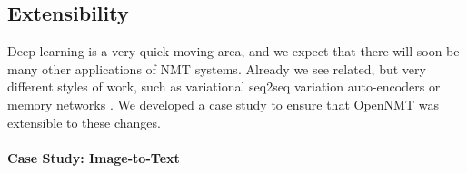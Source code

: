 \documentclass[11pt]{article}
\begin{document}



\subsection{Extensibility}

Deep learning is a very quick moving area, and we expect that there
will soon be many other applications of NMT systems.  Already we see
related, but very different styles of work, such as variational
seq2seq variation auto-encoders \cite{DBLP:conf/conll/BowmanVVDJB16}
or memory networks \cite{DBLP:journals/corr/WestonCB14}. We developed
a case study to ensure that OpenNMT was extensible to these changes.





\paragraph{Case Study: Image-to-Text}
\end{document}
